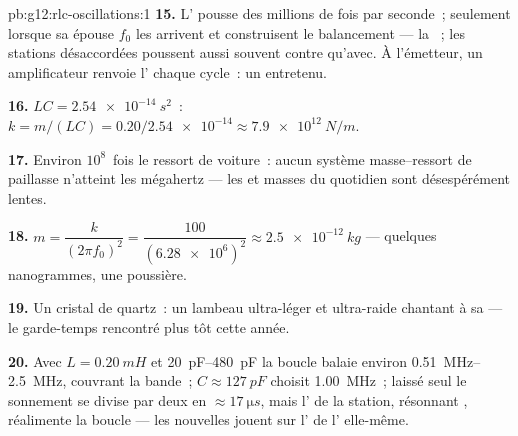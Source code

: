 \begin{solution}{pb:g12:rlc-oscillations:1}
\textbf{15.} L' pousse des millions de fois par
seconde~; seulement lorsque sa 
épouse $f_0$ les  arrivent  et construisent le
balancement --- la ~; les stations
désaccordées poussent aussi souvent contre qu'avec. À l'émetteur, un
amplificateur renvoie l'
 chaque cycle~: un 
entretenu.

\textbf{16.} $LC = \qty{2.54e-14}{s^2}$~: $k = m/(LC) =
0.20/\num{2.54e-14} \approx \qty{7.9e12}{N/m}$.

\textbf{17.} Environ $10^8$~fois le ressort de voiture~: aucun
système masse--ressort de paillasse n'atteint les mégahertz --- les
 et masses du quotidien sont désespérément lentes.

\textbf{18.} $m = \dfrac{k}{(2\pi f_0)^2} = \dfrac{100}
{(\num{6.28e6})^2} \approx \qty{2.5e-12}{kg}$ --- quelques nanogrammes,
une poussière.

\textbf{19.} Un cristal de quartz~: un lambeau ultra-léger et
ultra-raide chantant à sa  --- le
garde-temps rencontré plus tôt cette année.

\textbf{20.} Avec $L = \qty{0.20}{mH}$ et \qtyrange{20}{480}{pF} la
boucle balaie environ \qtyrange{0.51}{2.5}{MHz}, couvrant la bande~;
$C \approx \qty{127}{pF}$ choisit \qty{1.00}{MHz}~; laissé seul le
sonnement se divise par deux en $\approx \qty{17}{\micro s}$, mais
l' de la station, résonnant , réalimente
la boucle --- les nouvelles jouent sur
l' de l'
elle-même.
\end{solution}

